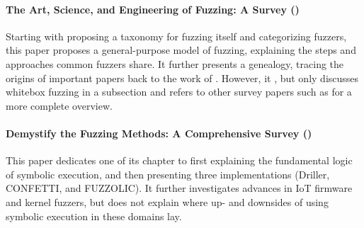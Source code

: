\documentclass{article}
\begin{document}
\begin{multicols}{2}
    \paragraph{The Art, Science, and Engineering of Fuzzing: A Survey (\citeyear{ArtScienceEng})}
    Starting with proposing a taxonomy for fuzzing itself and categorizing fuzzers, this paper proposes a general-purpose model of fuzzing, explaining the steps and approaches common fuzzers share. It further presents a genealogy, tracing the origins of important papers back to the work of \citeauthor*{UNIX}. However, it \cite{ArtScienceEng}, but only discusses whitebox fuzzing in a subsection and refers to other survey papers such as \cite{Orchestrated, AllYouEverWanted} for a more complete overview.\cite{ArtScienceEng}

    \paragraph{Demystify the Fuzzing Methods: A Comprehensive Survey (\citeyear{Demystifying})}
    This paper dedicates one of its chapter to first explaining the fundamental logic of symbolic execution, and then presenting three implementations (Driller\cite{Driller}, CONFETTI\cite{CONFETTI}, and FUZZOLIC\cite{FUZZOLIC}). It further investigates advances in IoT firmware and kernel fuzzers, but does not explain where up- and downsides of using symbolic execution in these domains lay.\cite{Demystifying}


\end{multicols}
\end{document}
